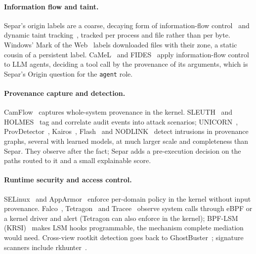 \documentclass[10pt,twocolumn,letterpaper]{article}
\begin{document}
\paragraph{Information flow and taint.} Separ's origin labels are a coarse, decaying form of
information-flow control~\cite{denning1976lattice} and dynamic taint
tracking~\cite{newsome2005dynamic}, tracked per process and file rather than per byte. Windows'
Mark of the Web~\cite{microsoft2024motw} labels downloaded files with their zone, a static
cousin of a persistent label. CaMeL~\cite{debenedetti2025camel} and FIDES~\cite{costa2025fides}
apply information-flow control to LLM agents, deciding a tool call by the provenance of its
arguments, which is Separ's Origin question for the \texttt{agent} role.

\paragraph{Provenance capture and detection.} CamFlow~\cite{pasquier2017practical} captures
whole-system provenance in the kernel. SLEUTH~\cite{hossain2017sleuth} and
HOLMES~\cite{milajerdi2019holmes} tag and correlate audit events into attack scenarios;
UNICORN~\cite{han2020unicorn}, ProvDetector~\cite{wang2020provdetector},
Kairos~\cite{cheng2024kairos}, Flash~\cite{rehman2024flash} and NODLINK~\cite{li2024nodlink}
detect intrusions in provenance graphs, several with learned models, at much larger scale and
completeness than Separ. They observe after the fact; Separ adds a pre-execution decision on the
paths routed to it and a small explainable score.

\paragraph{Runtime security and access control.} SELinux~\cite{smalley2001implementing} and
AppArmor~\cite{bauer2006paranoid} enforce per-domain policy in the kernel without input
provenance. Falco~\cite{falco2024cncf}, Tetragon~\cite{tetragon2024cilium} and
Tracee~\cite{aqua2024tracee} observe system calls through eBPF or a kernel driver and alert (Tetragon
can also enforce in the kernel); BPF-LSM (KRSI)~\cite{singh2019krsi} makes LSM hooks programmable,
the mechanism complete mediation would need. Cross-view rootkit detection goes back to
GhostBuster~\cite{wang2005strider}; signature scanners include rkhunter~\cite{rkhunter2018}.
\end{document}
